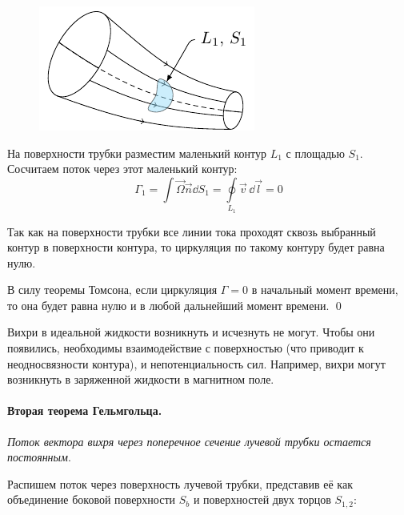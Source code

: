 
\begin{figure}[h!]
    \centering
    \includegraphics[scale=1.5]{img/toms2}
    \caption{}
    \label{fig:figure1}
\end{figure}

На поверхности трубки разместим маленький контур $L_1$ с площадью $S_1$. Сосчитаем поток через этот маленький контур:
\begin{equation}
	\Gamma_1=\int \vec\Omega \vec{n}\dd S_1 = \oint\limits_{L_1} \vec{v} \,\dd\vec{l} = 0
\end{equation}

Так как на поверхности трубки все линии тока проходят сквозь выбранный контур в поверхности контура, то циркуляция по такому контуру будет равна нулю. 

В силу теоремы Томсона, если циркуляция $\Gamma=0$ в начальный момент времени, то она будет равна нулю и в любой дальнейший момент времени.
\qed

Вихри в идеальной жидкости возникнуть и исчезнуть не могут. Чтобы они появились, необходимы взаимодействие с поверхностью (что приводит к неодносвязности контура), и непотенциальность сил. Например, вихри могут возникнуть в заряженной жидкости в магнитном поле.

\paragraph{Вторая теорема Гельмгольца. }\textit{Поток вектора вихря через поперечное сечение лучевой трубки остается постоянным}. 

Распишем поток через поверхность лучевой трубки, представив её как объединение боковой поверхности  $S_b$ и поверхностей двух торцов $S_{1,2}$:

